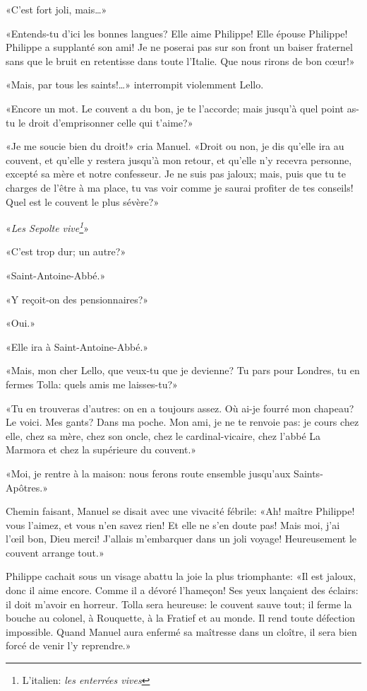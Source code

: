 «C'est fort joli, mais\ldots{}»

«Entends-tu d'ici les bonnes langues? Elle aime Philippe! Elle épouse Philippe! Philippe a supplanté son ami! Je ne poserai pas sur son front un baiser fraternel sans que le bruit en retentisse dans toute l'Italie. Que nous rirons de bon c\oe{}ur!»

«Mais, par tous les saints!\ldots{}» interrompit violemment Lello.

«Encore un mot. Le couvent a du bon, je te l'accorde; mais jusqu'à quel point as-tu le droit d'emprisonner celle qui t'aime?»

«Je me soucie bien du droit!» cria Manuel. «Droit ou non, je dis qu'elle ira au couvent, et qu'elle y restera jusqu'à mon retour, et qu'elle n'y recevra personne, excepté sa mère et notre confesseur. Je ne suis pas jaloux; mais, puis que tu te charges de l'être à ma place, tu vas voir comme je saurai profiter de tes conseils! Quel est le couvent le plus sévère?»

«\emph{Les Sepolte vive\footnote{
L'italien: \emph{les enterrées vives}
}}»

«C'est trop dur; un autre?»

«Saint-Antoine-Abbé.»

«Y reçoit-on des pensionnaires?»

«Oui.»

«Elle ira à Saint-Antoine-Abbé.»

«Mais, mon cher Lello, que veux-tu que je devienne? Tu pars pour Londres, tu en fermes Tolla: quels amis me laisses-tu?»

«Tu en trouveras d'autres: on en a toujours assez. Où ai-je fourré mon chapeau? Le voici. Mes gants? Dans ma poche. Mon ami, je ne te renvoie pas: je cours chez elle, chez sa mère, chez son oncle, chez le cardinal-vicaire, chez l'abbé La Marmora et chez la supérieure du couvent.»

«Moi, je rentre à la maison: nous ferons route ensemble jusqu'aux Saints-Apôtres.»

Chemin faisant, Manuel se disait avec une vivacité fébrile: «Ah! maître Philippe! vous l'aimez, et vous n'en savez rien! Et elle ne s'en doute pas! Mais moi, j'ai l'\oe{}il bon, Dieu merci! J'allais m'embarquer dans un joli voyage! Heureusement le couvent arrange tout.»

Philippe cachait sous un visage abattu la joie la plus triomphante: «Il est jaloux, donc il aime encore. Comme il a dévoré l'hameçon! Ses yeux lançaient des éclairs: il doit m'avoir en horreur. Tolla sera heureuse: le couvent sauve tout; il ferme la bouche au colonel, à Rouquette, à la Fratief et au monde. Il rend toute défection impossible. Quand Manuel aura enfermé sa maîtresse dans un cloître, il sera bien forcé de venir l'y reprendre.»

